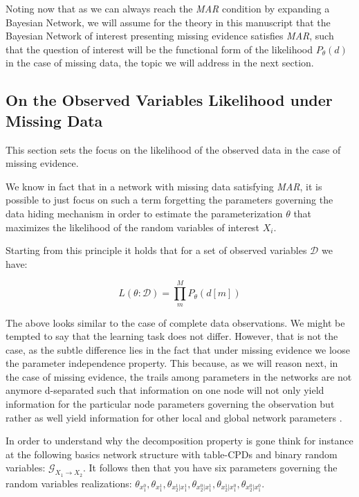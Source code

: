 \documentclass[11pt]{article}
\begin{document}
\begin{article}
Noting now that as we can always reach the \emph{MAR} condition by
expanding a Bayesian Network, we will assume for the theory in this
manuscript that the Bayesian Network of interest presenting missing
evidence satisfies \emph{MAR}, such that the question of interest will
be the functional form of the likelihood \(P_{\theta} (d)\) in the
case of missing data, the topic we will address in the next
section.

\subsection{On the Observed Variables Likelihood under Missing Data}
\label{sec:org79221b6}

This section sets the focus on the likelihood of the observed data
in the case of missing evidence.

We know in fact that in a network with missing data satisfying
\emph{MAR}, it is possible to just focus on such a term forgetting the
parameters governing the data hiding mechanism in order to estimate
the parameterization \(\theta\) that maximizes the likelihood of the
random variables of interest \(X_i\).

Starting from this principle it holds that for a set of observed
variables \(\mathscr{D}\) we have:

$$ L(\theta: \mathscr{D}) = \prod_m^M P_\theta(d[m]) $$

The above looks similar to the case of complete data
observations. We might be tempted to say that the learning task
does not differ. However, that is not the case, as the subtle
difference lies in the fact that under missing evidence we loose
the parameter independence property. This because, as we will
reason next, in the case of missing evidence, the trails among
parameters in the networks are not anymore d-separated such that
information on one node will not only yield information for the
particular node parameters governing the observation but rather as
well yield information for other local and global network
parameters .

In order to understand why the decomposition property is gone think
for instance at the following basics network structure with
table-CPDs and binary random variables: \(\mathscr{G}_{X_1
   \rightarrow X_2}\). It follows then that you have six parameters
governing the random variables realizations: \(\theta_{x_1^0},
   \theta_{x_1^1}, \theta_{x_2^1| x_1^1}, \theta_{x_2^0 | x_1^1},
   \theta_{x_2^1 | x_1^0}, \theta_{x_2^0 | x_1^0}\).


\end{article}
\end{document}
